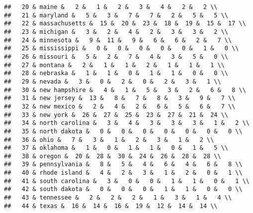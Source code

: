 \documentclass[]{article}
\begin{document}
\begin{verbatim}
##   20 & maine &   2 &   1 &   2 &   3 &   4 &   2 &   2 \\ 
##   21 & maryland &   5 &   3 &   7 &   7 &   2 &   5 &   5 \\ 
##   22 & massachusetts &  15 &  20 &  23 &  18 &  19 &  15 &  17 \\ 
##   23 & michigan &   3 &   2 &   4 &   2 &   3 &   3 &   2 \\ 
##   24 & minnesota &   9 &  11 &   9 &   6 &   6 &   2 &   7 \\ 
##   25 & mississippi &   0 &   0 &   0 &   0 &   0 &   1 &   0 \\ 
##   26 & missouri &   5 &   2 &   7 &   4 &   3 &   5 &   0 \\ 
##   27 & montana &   2 &   1 &   1 &   2 &   1 &   1 &   1 \\ 
##   28 & nebraska &   1 &   1 &   0 &   1 &   1 &   0 &   0 \\ 
##   29 & nevada &   3 &   0 &   2 &   0 &   2 &   3 &   1 \\ 
##   30 & new hampshire &   4 &   1 &   5 &   3 &   2 &   6 &   8 \\ 
##   31 & new jersey &  13 &   8 &   7 &   8 &   3 &   9 &   7 \\ 
##   32 & new mexico &   2 &   4 &   2 &   6 &   5 &   6 &   7 \\ 
##   33 & new york &  26 &  27 &  25 &  23 &  27 &  21 &  24 \\ 
##   34 & north carolina &   3 &   4 &   3 &   3 &   3 &   1 &   2 \\ 
##   35 & north dakota &   0 &   0 &   0 &   0 &   0 &   0 &   0 \\ 
##   36 & ohio &   7 &   3 &   1 &   2 &   3 &   1 &   2 \\ 
##   37 & oklahoma &   1 &   0 &   1 &   1 &   0 &   1 &   5 \\ 
##   38 & oregon &  20 &  28 &  30 &  24 &  26 &  28 &  28 \\ 
##   39 & pennsylvania &   8 &   5 &   4 &   6 &   4 &   6 &   8 \\ 
##   40 & rhode island &   4 &   2 &   3 &   1 &   2 &   0 &   1 \\ 
##   41 & south carolina &   3 &   0 &   0 &   1 &   1 &   0 &   1 \\ 
##   42 & south dakota &   0 &   0 &   0 &   1 &   1 &   0 &   0 \\ 
##   43 & tennessee &   2 &   2 &   2 &   1 &   3 &   1 &   4 \\ 
##   44 & texas &  16 &  14 &  16 &  19 &  12 &  14 &  14 \\ 

\end{verbatim}
\end{document}
